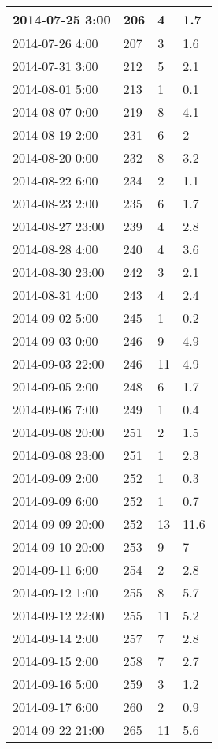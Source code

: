 \documentclass[
]{article}
\begin{document}
\begin{tabular}{l|l|l|l}
\hline
2014-07-25 3:00 & 206 & 4 & 1.7\\
\hline
2014-07-26 4:00 & 207 & 3 & 1.6\\
\hline
2014-07-31 3:00 & 212 & 5 & 2.1\\
\hline
2014-08-01 5:00 & 213 & 1 & 0.1\\
\hline
2014-08-07 0:00 & 219 & 8 & 4.1\\
\hline
2014-08-19 2:00 & 231 & 6 & 2\\
\hline
2014-08-20 0:00 & 232 & 8 & 3.2\\
\hline
2014-08-22 6:00 & 234 & 2 & 1.1\\
\hline
2014-08-23 2:00 & 235 & 6 & 1.7\\
\hline
2014-08-27 23:00 & 239 & 4 & 2.8\\
\hline
2014-08-28 4:00 & 240 & 4 & 3.6\\
\hline
2014-08-30 23:00 & 242 & 3 & 2.1\\
\hline
2014-08-31 4:00 & 243 & 4 & 2.4\\
\hline
2014-09-02 5:00 & 245 & 1 & 0.2\\
\hline
2014-09-03 0:00 & 246 & 9 & 4.9\\
\hline
2014-09-03 22:00 & 246 & 11 & 4.9\\
\hline
2014-09-05 2:00 & 248 & 6 & 1.7\\
\hline
2014-09-06 7:00 & 249 & 1 & 0.4\\
\hline
2014-09-08 20:00 & 251 & 2 & 1.5\\
\hline
2014-09-08 23:00 & 251 & 1 & 2.3\\
\hline
2014-09-09 2:00 & 252 & 1 & 0.3\\
\hline
2014-09-09 6:00 & 252 & 1 & 0.7\\
\hline
2014-09-09 20:00 & 252 & 13 & 11.6\\
\hline
2014-09-10 20:00 & 253 & 9 & 7\\
\hline
2014-09-11 6:00 & 254 & 2 & 2.8\\
\hline
2014-09-12 1:00 & 255 & 8 & 5.7\\
\hline
2014-09-12 22:00 & 255 & 11 & 5.2\\
\hline
2014-09-14 2:00 & 257 & 7 & 2.8\\
\hline
2014-09-15 2:00 & 258 & 7 & 2.7\\
\hline
2014-09-16 5:00 & 259 & 3 & 1.2\\
\hline
2014-09-17 6:00 & 260 & 2 & 0.9\\
\hline
2014-09-22 21:00 & 265 & 11 & 5.6\\

\end{tabular}
\end{document}
